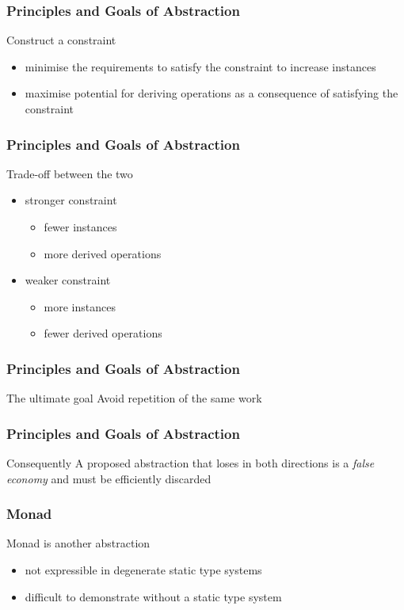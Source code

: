 \begin{frame}
\frametitle{Principles and Goals of Abstraction}
\begin{block}{Construct a constraint}
\begin{itemize}
  \item minimise the requirements to satisfy the constraint to increase instances
  \item maximise potential for deriving operations as a consequence of satisfying the constraint 
\end{itemize}
\end{block}
\end{frame}


\begin{frame}
\frametitle{Principles and Goals of Abstraction}
\begin{block}{Trade-off between the two}
\begin{itemize}
  \item stronger constraint
    \begin{itemize}
      \item fewer instances
      \item more derived operations
    \end{itemize}
  \item weaker constraint
    \begin{itemize}
      \item more instances
      \item fewer derived operations
    \end{itemize}
\end{itemize}
\end{block}
\end{frame}


\begin{frame}
\frametitle{Principles and Goals of Abstraction}
\begin{block}{The ultimate goal}
Avoid repetition of the same work
\end{block}
\end{frame}


\begin{frame}
\frametitle{Principles and Goals of Abstraction}
\begin{block}{Consequently}
A proposed abstraction that loses in both directions is a \emph{false economy} and must be efficiently discarded
\end{block}
\end{frame}


\begin{frame}
\frametitle{Monad}
\begin{block}{Monad is another abstraction}
\begin{itemize}
  \item not expressible in degenerate static type systems
  \item difficult to demonstrate without a static type system
\end{itemize}
\end{block}
\end{frame}


